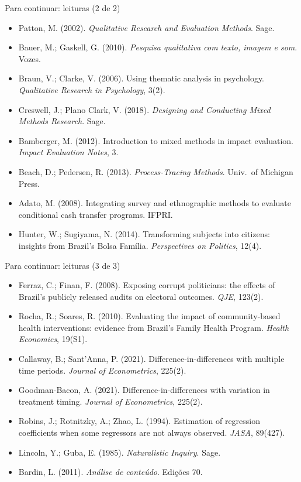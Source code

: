 \begin{frame}{Para continuar: leituras (2 de 2)}
  \scriptsize
  \begin{itemize}
    \item Patton, M. (2002). \emph{Qualitative Research and Evaluation Methods}. Sage.
    \item Bauer, M.; Gaskell, G. (2010). \emph{Pesquisa qualitativa com texto, imagem e som}. Vozes.
    \item Braun, V.; Clarke, V. (2006). Using thematic analysis in psychology. \emph{Qualitative Research in Psychology}, 3(2).
    \item Creswell, J.; Plano Clark, V. (2018). \emph{Designing and Conducting Mixed Methods Research}. Sage.
    \item Bamberger, M. (2012). Introduction to mixed methods in impact evaluation. \emph{Impact Evaluation Notes}, 3.
    \item Beach, D.; Pedersen, R. (2013). \emph{Process-Tracing Methods}. Univ.\ of Michigan Press.
    \item Adato, M. (2008). Integrating survey and ethnographic methods to evaluate conditional cash transfer programs. IFPRI.
    \item Hunter, W.; Sugiyama, N. (2014). Transforming subjects into citizens: insights from Brazil's Bolsa Família. \emph{Perspectives on Politics}, 12(4).
  \end{itemize}
\end{frame}

\begin{frame}{Para continuar: leituras (3 de 3)}
  \scriptsize
  \begin{itemize}
    \item Ferraz, C.; Finan, F. (2008). Exposing corrupt politicians: the effects of Brazil's publicly released audits on electoral outcomes. \emph{QJE}, 123(2).
    \item Rocha, R.; Soares, R. (2010). Evaluating the impact of community-based health interventions: evidence from Brazil's Family Health Program. \emph{Health Economics}, 19(S1).
    \item Callaway, B.; Sant'Anna, P. (2021). Difference-in-differences with multiple time periods. \emph{Journal of Econometrics}, 225(2).
    \item Goodman-Bacon, A. (2021). Difference-in-differences with variation in treatment timing. \emph{Journal of Econometrics}, 225(2).
    \item Robins, J.; Rotnitzky, A.; Zhao, L. (1994). Estimation of regression coefficients when some regressors are not always observed. \emph{JASA}, 89(427).
    \item Lincoln, Y.; Guba, E. (1985). \emph{Naturalistic Inquiry}. Sage.
    \item Bardin, L. (2011). \emph{Análise de conteúdo}. Edições 70.
  \end{itemize}
\end{frame}

